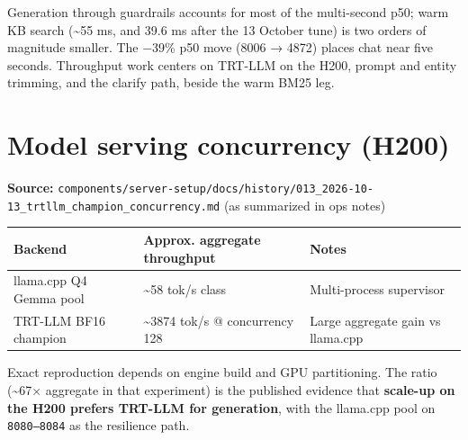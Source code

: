 Generation through guardrails accounts for most of the multi-second p50; warm KB search (\textasciitilde55 ms, and 39.6 ms after the 13 October tune) is two orders of magnitude smaller. The −39\% p50 move (8006 → 4872) places chat near five seconds. Throughput work centers on TRT-LLM on the H200, prompt and entity trimming, and the clarify path, beside the warm BM25 leg.

\section{Model serving concurrency (H200)}\label{model-serving-concurrency-h200}

\textbf{Source:} \texttt{components/server-setup/docs/history/013\_2026-10-13\_trtllm\_champion\_concurrency.md} (as summarized in ops notes)

\begin{longtable}[]{@{}
  >{\raggedright\arraybackslash}p{}
  >{\raggedright\arraybackslash}p{}
  >{\raggedright\arraybackslash}p{}@{}}
\toprule\noalign{}
Backend & Approx. aggregate throughput & Notes \\
\midrule\noalign{}
\endhead
\bottomrule\noalign{}
\endlastfoot
llama.cpp Q4 Gemma pool & \textasciitilde58 tok/s class & Multi-process supervisor \\
TRT-LLM BF16 champion & \textasciitilde3874 tok/s @ concurrency 128 & Large aggregate gain vs llama.cpp \\
\end{longtable}

Exact reproduction depends on engine build and GPU partitioning. The ratio (\textasciitilde67× aggregate in that experiment) is the published evidence that \textbf{scale-up on the H200 prefers TRT-LLM for generation}, with the llama.cpp pool on \texttt{8080–8084} as the resilience path.
